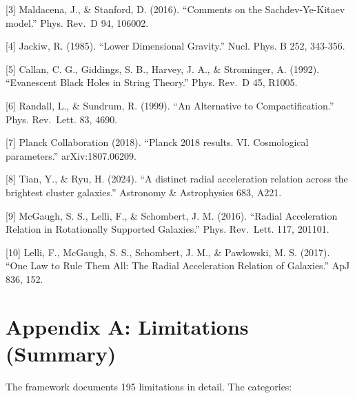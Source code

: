 {[}3{]} Maldacena, J., \& Stanford, D. (2016). ``Comments on the
Sachdev-Ye-Kitaev model.'' Phys. Rev.~D 94, 106002.

{[}4{]} Jackiw, R. (1985). ``Lower Dimensional Gravity.'' Nucl. Phys. B
252, 343-356.

{[}5{]} Callan, C. G., Giddings, S. B., Harvey, J. A., \& Strominger, A.
(1992). ``Evanescent Black Holes in String Theory.'' Phys. Rev.~D 45,
R1005.

{[}6{]} Randall, L., \& Sundrum, R. (1999). ``An Alternative to
Compactification.'' Phys. Rev.~Lett. 83, 4690.

{[}7{]} Planck Collaboration (2018). ``Planck 2018 results. VI.
Cosmological parameters.'' arXiv:1807.06209.

{[}8{]} Tian, Y., \& Ryu, H. (2024). ``A distinct radial acceleration
relation across the brightest cluster galaxies.'' Astronomy \&
Astrophysics 683, A221.

{[}9{]} McGaugh, S. S., Lelli, F., \& Schombert, J. M. (2016). ``Radial
Acceleration Relation in Rotationally Supported Galaxies.'' Phys.
Rev.~Lett. 117, 201101.

{[}10{]} Lelli, F., McGaugh, S. S., Schombert, J. M., \& Pawlowski, M.
S. (2017). ``One Law to Rule Them All: The Radial Acceleration Relation
of Galaxies.'' ApJ 836, 152.

\hypertarget{appendix-a-limitations-summary}{%
\section{Appendix A: Limitations
(Summary)}\label{appendix-a-limitations-summary}}

The framework documents 195 limitations in detail. The categories:

